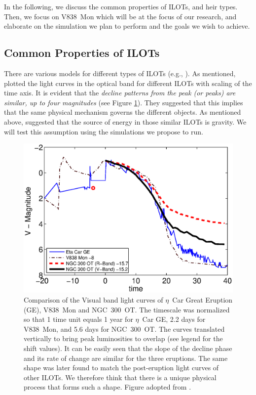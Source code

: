\documentclass[modern]{aastex62}
\begin{document}
In the following, we discuss the common properties of ILOTs, and heir types.
Then, we focus on V838~Mon which will be at the focus of our research, and elaborate on the simulation we plan to perform and the goals we wish to achieve.

\subsection{Common Properties of ILOTs}

There are various models for different types of ILOTs (e.g., \citealt{2006A&A...451..223T,2007Natur.447..458K,2007Natur.449E...1P,2009ApJ...699.1850B,2009ApJ...697L..49S,2010ApJ...709L..11K,2010A&A...516A.108M,2010MNRAS.408..181P,2011A&A...528A.114T,2011MNRAS.415.2020S,2011MNRAS.415.2009S,2011MNRAS.415..773S,2011ApJ...730..134K,2014MNRAS.443.1319K,2015A&A...580A..34K,2016ApJ...817...66K,2018A&A...617A.129K,2019arXiv190100871J}).
As mentioned, \cite{2010ApJ...709L..11K} plotted the light curves in the optical band for different ILOTs with scaling of the time axis. 
It is evident that the \textit{decline patterns from the peak (or peaks) are similar, up to four magnitudes} (see Figure \ref{fig:0909.1909.TC1p2}).
They suggested that this implies that the same physical mechanism governs the different objects.
As mentioned above, \cite{2016RAA....16...99K} suggested that the source of energy in those similar ILOTs is gravity.
We will test this assumption using the simulations we propose to run.
\begin{figure}[t!]
\includegraphics[width=\linewidth]{TC1p2.eps}
\caption{Comparison of the Visual band light curves of $\eta$~Car Great Eruption (GE), V838~Mon and NGC~300~OT. The timescale was normalized so that 1 time unit equals 1 year for $\eta$~Car GE, 2.2 days for V838~Mon, and 5.6 days for NGC~300~OT.
The curves translated vertically to bring peak luminosities to overlap (see legend for the shift values). 
It can be easily seen that the slope of the decline phase and its rate of change are similar for the three eruptions.
The same shape was later found to match the post-eruption light curves of other ILOTs.
We therefore think that there is a unique physical process that forms such a shape.
Figure adopted from \cite{2010ApJ...709L..11K}.}
\label{fig:0909.1909.TC1p2}
\end{figure}
\end{document}

